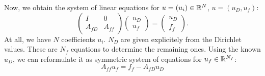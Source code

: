 Now, we obtain the system of linear equations for $u = (u_i) \in {\mathbb R}^N$, $u = (u_D, u_f)$:
\begin{equation}
\label{equ_linear_system}
\left( \begin{array}{cc}
        I & 0 \\
        A_{fD} & A_{ff} 
        \end{array} \right)
 \left( \begin{array}{c}
        u_{D} \\
        u_{f}
        \end{array} \right)
=
\left( \begin{array}{c}
        u_{D} \\
        f_{f}
        \end{array} \right).
\end{equation}
At all, we have $N$ coefficients $u_i$. $N_D$ are given explicitely from the
Dirichlet values. These are $N_f$ equations to determine the remaining ones.
Using the known $u_D$, we can reformulate it as symmetric system of equations for $u_f \in {\mathbb R}^{N_f}$:
$$
A_{ff} u_f = f_f - A_{fD} u_D
$$
